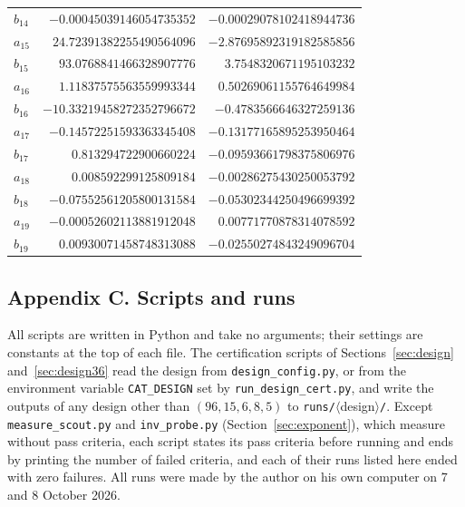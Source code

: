\documentclass[11pt]{article}
\theoremstyle{definition}
\begin{document}
{\begin{longtable}{lrr}
$b_{14}$ & $-0.00045039146054735352$ & $-0.00029078102418944736$\\
$a_{15}$ & $24.72391382255490564096$ & $-2.87695892319182585856$\\
$b_{15}$ & $93.0768841466328907776$ & $3.7548320671195103232$\\
$a_{16}$ & $1.11837575563559993344$ & $0.50269061155764649984$\\
$b_{16}$ & $-10.33219458272352796672$ & $-0.4783566646327259136$\\
$a_{17}$ & $-0.14572251593363345408$ & $-0.13177165895253950464$\\
$b_{17}$ & $0.813294722900660224$ & $-0.09593661798375806976$\\
$a_{18}$ & $0.008592299125809184$ & $-0.00286275430250053792$\\
$b_{18}$ & $-0.07552561205800131584$ & $-0.05302344250496699392$\\
$a_{19}$ & $-0.00052602113881912048$ & $0.00771770878314078592$\\
$b_{19}$ & $0.00930071458748313088$ & $-0.02550274843249096704$\\
\bottomrule
\end{longtable}}

\clearpage
\subsection*{Appendix C. Scripts and runs}

All scripts are written in Python and take no arguments; their settings are constants at the top of each file. The certification scripts of Sections~\ref{sec:design} and~\ref{sec:design36} read the design from \texttt{design\_config.py}, or from the environment variable \texttt{CAT\_DESIGN} set by \texttt{run\_design\_cert.py}, and write the outputs of any design other than $(96,15,6,8,5)$ to \texttt{runs/}$\langle$design$\rangle$\texttt{/}. Except \texttt{measure\_scout.py} and \texttt{inv\_probe.py} (Section~\ref{sec:exponent}), which measure without pass criteria, each script states its pass criteria before running and ends by printing the number of failed criteria, and each of their runs listed here ended with zero failures. All runs were made by the author on his own computer on 7 and 8 October 2026.
\end{document}
